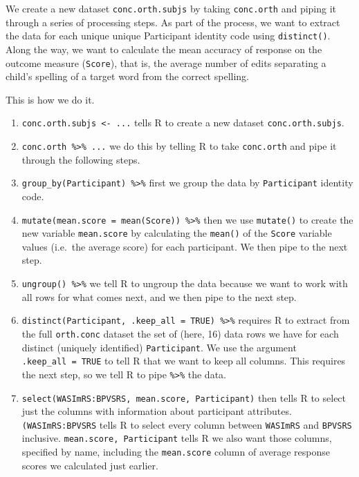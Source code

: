 \documentclass[
  letterpaper,
  DIV=11,
  numbers=noendperiod]{scrreprt}
\providecommand{\tightlist}{%
  \setlength{\itemsep}{0pt}\setlength{\parskip}{0pt}}\usepackage{longtable,booktabs,array}
\begin{document}
We create a new dataset \texttt{conc.orth.subjs} by taking
\texttt{conc.orth} and piping it through a series of processing steps.
As part of the process, we want to extract the data for each unique
unique Participant identity code using \texttt{distinct()}. Along the
way, we want to calculate the mean accuracy of response on the outcome
measure (\texttt{Score}), that is, the average number of edits
separating a child's spelling of a target word from the correct
spelling.

This is how we do it.

\begin{enumerate}
\def\labelenumi{\arabic{enumi}.}
\tightlist
\item
  \texttt{conc.orth.subjs\ \textless{}-\ ...} tells R to create a new
  dataset \texttt{conc.orth.subjs}.
\item
  \texttt{conc.orth\ \%\textgreater{}\%\ ...} we do this by telling R to
  take \texttt{conc.orth} and pipe it through the following steps.
\item
  \texttt{group\_by(Participant)\ \%\textgreater{}\%} first we group the
  data by \texttt{Participant} identity code.
\item
  \texttt{mutate(mean.score\ =\ mean(Score))\ \%\textgreater{}\%} then
  we use \texttt{mutate()} to create the new variable
  \texttt{mean.score} by calculating the \texttt{mean()} of the
  \texttt{Score} variable values (i.e.~the average score) for each
  participant. We then pipe to the next step.
\item
  \texttt{ungroup()\ \%\textgreater{}\%} we tell R to ungroup the data
  because we want to work with all rows for what comes next, and we then
  pipe to the next step.
\item
  \texttt{distinct(Participant,\ .keep\_all\ =\ TRUE)\ \%\textgreater{}\%}
  requires R to extract from the full \texttt{orth.conc} dataset the set
  of (here, 16) data rows we have for each distinct (uniquely
  identified) \texttt{Participant}. We use the argument
  \texttt{.keep\_all\ =\ TRUE} to tell R that we want to keep all
  columns. This requires the next step, so we tell R to pipe
  \texttt{\%\textgreater{}\%} the data.
\item
  \texttt{select(WASImRS:BPVSRS,\ mean.score,\ Participant)} then tells
  R to select just the columns with information about participant
  attributes. \texttt{(WASImRS:BPVSRS} tells R to select every column
  between \texttt{WASImRS} and \texttt{BPVSRS} inclusive.
  \texttt{mean.score,\ Participant} tells R we also want those columns,
  specified by name, including the \texttt{mean.score} column of average
  response scores we calculated just earlier.
\end{enumerate}
\end{document}
